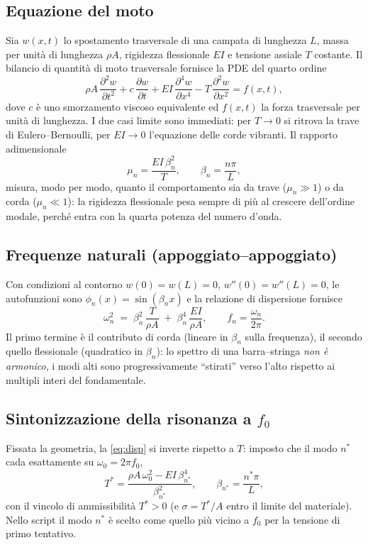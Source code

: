 \documentclass[11pt,a4paper]{article}
\newcommand{\dpar}[2]{\frac{\partial #1}{\partial #2}}
\begin{document}
\subsection{Equazione del moto}
Sia $w(x,t)$ lo spostamento trasversale di una campata di lunghezza $L$, massa
per unit\`a di lunghezza $\rho A$, rigidezza flessionale $EI$ e tensione
assiale $T$ costante. Il bilancio di quantit\`a di moto trasversale fornisce
la PDE del quarto ordine
\begin{equation}
\rho A \,\dpar{^2 w}{t^2}
+ c\,\dpar{w}{t}
+ EI\,\dpar{^4 w}{x^4}
- T\,\dpar{^2 w}{x^2}
= f(x,t),
\label{eq:pde}
\end{equation}
dove $c$ \`e uno smorzamento viscoso equivalente ed $f(x,t)$ la forza
trasversale per unit\`a di lunghezza. I due casi limite sono immediati: per
$T \to 0$ si ritrova la trave di Eulero--Bernoulli, per $EI \to 0$ l'equazione
delle corde vibranti. Il rapporto adimensionale
\begin{equation}
\mu_n = \frac{EI\,\beta_n^2}{T}, \qquad \beta_n = \frac{n\pi}{L},
\end{equation}
misura, modo per modo, quanto il comportamento sia da trave ($\mu_n \gg 1$) o
da corda ($\mu_n \ll 1$): la rigidezza flessionale pesa sempre di pi\`u al
crescere dell'ordine modale, perch\'e entra con la quarta potenza del numero
d'onda.

\subsection{Frequenze naturali (appoggiato--appoggiato)}
Con condizioni al contorno $w(0)=w(L)=0$, $w''(0)=w''(L)=0$, le autofunzioni
sono $\phi_n(x)=\sin(\beta_n x)$ e la relazione di dispersione fornisce
\begin{equation}
\omega_n^2 \;=\; \beta_n^2\,\frac{T}{\rho A}
\;+\; \beta_n^4\,\frac{EI}{\rho A},
\qquad
f_n = \frac{\omega_n}{2\pi}.
\label{eq:disp}
\end{equation}
Il primo termine \`e il contributo di corda (lineare in $\beta_n$ sulla
frequenza), il secondo quello flessionale (quadratico in $\beta_n$): lo
spettro di una barra--stringa \emph{non \`e armonico}, i modi alti sono
progressivamente ``stirati'' verso l'alto rispetto ai multipli interi del
fondamentale.

\subsection{Sintonizzazione della risonanza a \texorpdfstring{$f_0$}{f0}}
Fissata la geometria, la \eqref{eq:disp} si inverte rispetto a $T$: imposto
che il modo $n^\ast$ cada esattamente su $\omega_0 = 2\pi f_0$,
\begin{equation}
T^\ast = \frac{\rho A\,\omega_0^2 - EI\,\beta_{n^\ast}^4}{\beta_{n^\ast}^2},
\qquad \beta_{n^\ast} = \frac{n^\ast\pi}{L},
\label{eq:tuning}
\end{equation}
con il vincolo di ammissibilit\`a $T^\ast > 0$ (e $\sigma = T^\ast/A$ entro il
limite del materiale). Nello script il modo $n^\ast$ \`e scelto come quello
pi\`u vicino a $f_0$ per la tensione di primo tentativo.
\end{document}
